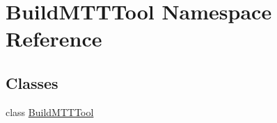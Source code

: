 \hypertarget{namespaceBuildMTTTool}{\section{Build\-M\-T\-T\-Tool Namespace Reference}
\label{namespaceBuildMTTTool}
}
\subsection*{Classes}
\begin{DoxyCompactItemize}
\item 
class \hyperlink{classBuildMTTTool_1_1BuildMTTTool}{Build\-M\-T\-T\-Tool}
\end{DoxyCompactItemize}
